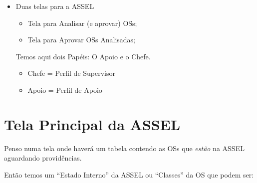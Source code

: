 \begin{itemize}
	\item Duas telas para a ASSEL

	\begin{itemize}
		\item Tela para Analisar (e aprovar) OSs;
		\item Tela para Aprovar OSs Analisadas;
	\end{itemize}
		
	Temos aqui dois Papéis: O Apoio e o Chefe.	

	\begin{itemize}
		\item Chefe = Perfil de Supervisor
		\item Apoio = Perfil de Apoio
	\end{itemize}

	
	
	
	
	
	


\end{itemize}




\section{Tela Principal da ASSEL}

Penso numa tela onde haverá um tabela contendo as OSs que \emph{estão} na ASSEL aguardando providências.

Então temos um ``Estado Interno'' da ASSEL ou ``Classes'' da OS que podem ser:


